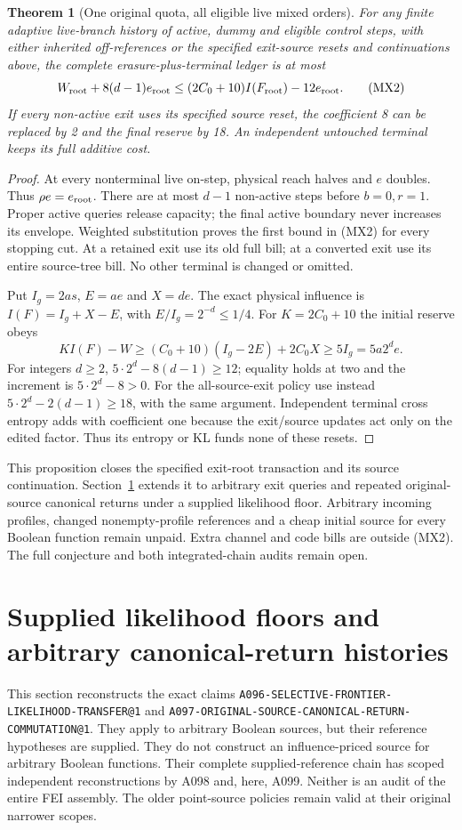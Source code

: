 \documentclass[11pt]{article}
\newtheorem{theorem}[lemma]{Theorem}
\begin{document}
\begin{theorem}[One original quota, all eligible live mixed orders]
For any finite adaptive live-branch history of active, dummy and
eligible control steps, with either inherited off-references or
the specified exit-source resets and continuations above, the
complete erasure-plus-terminal ledger is at most
\[
 W_{\rm root}+8(d-1)e_{\rm root}
 \le (2C_0+10)I(F_{\rm root})-12e_{\rm root}.
 \tag{MX2}
\]
If every non-active exit uses its specified source reset, the
coefficient 8 can be replaced by 2 and the final reserve by 18.
An independent untouched terminal keeps its full additive cost.
\end{theorem}
\begin{proof}
At every nonterminal live on-step, physical reach halves and
$e$ doubles. Thus $\rho e=e_{\rm root}$. There are at most
$d-1$ non-active steps before $b=0,r=1$. Proper active queries
release capacity; the final active boundary never increases its
envelope. Weighted substitution proves the first bound in (MX2)
for every stopping cut. At a retained exit use its old full bill;
at a converted exit use its entire source-tree bill. No other
terminal is changed or omitted.

Put $I_g=2as$, $E=ae$ and $X=de$. The exact physical influence
is $I(F)=I_g+X-E$, with $E/I_g=2^{-d}\le1/4$. For
$K=2C_0+10$ the initial reserve obeys
\[
 KI(F)-W\ge(C_0+10)(I_g-2E)+2C_0X\ge5I_g
              =5a2^d e.
\]
For integers $d\ge2$, $5\cdot2^d-8(d-1)\ge12$; equality
holds at two and the increment is $5\cdot2^d-8>0$.
For the all-source-exit policy use instead
$5\cdot2^d-2(d-1)\ge18$, with the same argument.
Independent terminal cross entropy adds with coefficient one
because the exit/source updates act only on the edited factor.
Thus its entropy or KL funds none of these resets.
\end{proof}

This proposition closes the specified exit-root transaction and its
source continuation. Section~\ref{sec:suppliedreturn} extends it to
arbitrary exit queries and repeated original-source canonical returns
under a supplied likelihood floor. Arbitrary incoming profiles, changed
nonempty-profile references and a cheap initial source for every Boolean
function remain unpaid. Extra channel and code bills are outside (MX2).
The full conjecture and both integrated-chain audits remain open.

\section{Supplied likelihood floors and arbitrary canonical-return histories}
\label{sec:suppliedreturn}
This section reconstructs the exact claims
\texttt{A096-SELECTIVE-FRONTIER-LIKELIHOOD-TRANSFER@1} and
\texttt{A097-ORIGINAL-SOURCE-CANONICAL-RETURN-COMMUTATION@1}.
They apply to arbitrary Boolean sources, but their reference hypotheses
are supplied. They do not construct an influence-priced source for arbitrary
Boolean functions. Their complete supplied-reference chain has scoped
independent reconstructions by A098 and, here, A099. Neither is an audit
of the entire FEI assembly. The older point-source policies remain valid
at their original narrower scopes.
\end{document}
